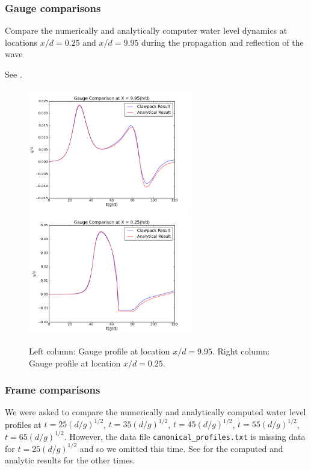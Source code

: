 \subsubsection{Gauge comparisons}
Compare the numerically and analytically computer water level dynamics at locations $x/d = 0.25$ and $x/d = 9.95$ during the propagation and reflection of the wave


See .

\begin{figure}[ht]
\hfil\includegraphics[width=2.8in]{bp1/plotgauge2.png}\hfil
\hfil\includegraphics[width=2.8in]{bp1/plotgauge1.png}\hfil
\caption{\label{fig:bp1gauges} 
Left column: Gauge profile at location $x/d = 9.95$.
Right column: Gauge profile at location $x/d = 0.25$.
 }
\end{figure}



\subsubsection{Frame comparisons}
We were asked to
compare the numerically and analytically computed water level profiles at $t = 25(d/g)^{1/2}$, $t = 35(d/g)^{1/2}$, $t = 45(d/g)^{1/2}$, $t = 55(d/g)^{1/2}$, $t = 65(d/g)^{1/2}$.
However, the data file {\tt canonical\_profiles.txt} is missing data for
$t=25(d/g)^{1/2}$ and so we omitted this time.
See  for the computed and analytic results for the other
times.

